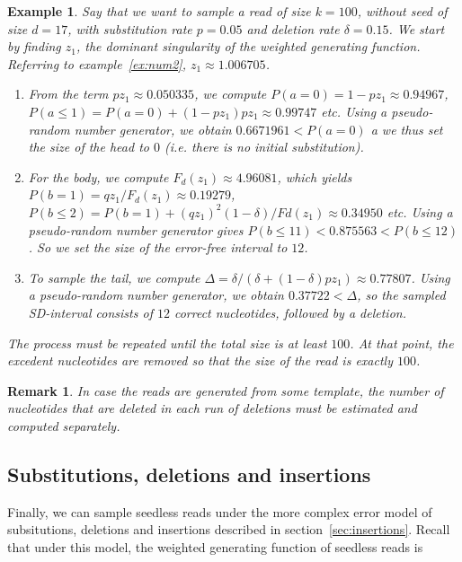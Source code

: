 \documentclass{article}
\newtheorem{example}{Example}
\newtheorem{remark}{Remark}
\begin{document}
\begin{example}
Say that we want to sample a read of size $k=100$, without seed of size
$d=17$, with substitution rate $p = 0.05$ and deletion rate $\delta=0.15$.
We start by finding $z_1$, the dominant singularity of the weighted
generating function. Referring to example~\ref{ex:num2}, $z_1 \approx
1.006705$.

\begin{enumerate}

\item
From the term $pz_1 \approx 0.050335$, we compute $P(a=0) = 1-pz_1
\approx 0.94967$, $P(a \leq 1) = P(a=0) + (1-pz_1)pz_1 \approx 0.99747$
\textit{etc}. Using a pseudo-random number generator, we obtain $0.6671961
< P(a=0)$ a we thus set the size of the head to $0$ (\textit{i.e.} there
is no initial substitution).

\item
For the body, we compute $F_d(z_1) \approx 4.96081$, which yields
$P(b=1) = qz_1/F_d(z_1) \approx 0.19279$, $P(b \leq 2) = P(b=1)
+ (qz_1)^2(1-\delta)/Fd(z_1) \approx 0.34950$ \textit{etc}. Using a
pseudo-random number generator gives $P(b \leq 11) < 0.875563 < P(b
\leq 12)$. So we set the size of the error-free interval to $12$.

\item
To sample the tail, we compute $\Delta = \delta / (\delta +
(1-\delta)pz_1) \approx 0.77807$.  Using a pseudo-random number generator,
we obtain $0.37722 < \Delta$, so the sampled SD-interval consists of
$12$ correct nucleotides, followed by a deletion.
\end{enumerate}

The process must be repeated until the total size is at least $100$. At
that point, the excedent nucleotides are removed so that the size of the
read is exactly $100$.
\end{example}

\begin{remark}
In case the reads are generated from some template, the number of
nucleotides that are deleted in each run of deletions must be estimated
and computed separately.
\end{remark}




\subsection{Substitutions, deletions and insertions}

Finally, we can sample seedless reads under the more complex error model
of subsitutions, deletions and insertions described in
section~\ref{sec:insertions}. Recall that under this model, the weighted
generating function of seedless reads is
\end{document}
